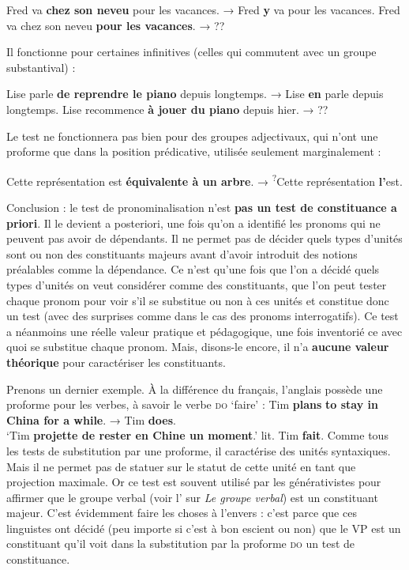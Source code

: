 {    \ea
    {Fred va} \textbf{{chez son neveu}}  {pour les vacances.}     \textrm{→}   {Fred} \textbf{{y}}  {va pour les vacances.}
    \z
    \ea
    {Fred va chez son neveu} \textbf{{pour les vacances}}.     \textrm{→}  ??
    \z

    Il fonctionne pour certaines infinitives (celles qui commutent avec un groupe substantival) :

    \ea
    {Lise parle} \textbf{{de reprendre le piano}}  {depuis longtemps.}    \textrm{→}   {Lise} \textbf{{en}}  {parle depuis longtemps.}
    \z
    \ea
    {Lise recommence} \textbf{{à jouer du piano}}  {depuis hier.}     \textrm{→}  ??
    \z

    Le test ne fonctionnera pas bien pour des groupes adjectivaux, qui n’ont une proforme que dans la position prédicative, utilisée seulement marginalement :

    \ea
    {Cette représentation est} \textbf{{équivalente à un arbre}}.     \textrm{→}  \textsuperscript{?}{Cette représentation} \textbf{{l’}}{est.}
    \z

    Conclusion : le test de pronominalisation n’est \textbf{pas un test de constituance a priori}. Il le devient a posteriori, une fois qu’on a identifié les pronoms qui ne peuvent pas avoir de dépendants. Il ne permet pas de décider quels types d’unités sont ou non des constituants majeurs avant d’avoir introduit des notions préalables comme la dépendance. Ce n’est qu’une fois que l’on a décidé quels types d’unités on veut considérer comme des constituants, que l’on peut tester chaque pronom pour voir s’il se substitue ou non à ces unités et constitue donc un test (avec des surprises comme dans le cas des pronoms interrogatifs). Ce test a néanmoins une réelle valeur pratique et pédagogique, une fois inventorié ce avec quoi se substitue chaque pronom. Mais, disons-le encore, il n’a \textbf{aucune valeur théorique} pour caractériser les constituants.

    Prenons un dernier exemple. À la différence du français, l’anglais possède une proforme pour les verbes, à savoir le verbe \textsc{do} ‘faire’ :
    \ea
        {Tim} \textbf{{plans}} \textbf{{to stay in China for a while}}.      \textrm{→}   {Tim} \textbf{{does}}.\\
        \glt   ‘Tim \textbf{projette de rester en Chine un moment}.’     lit. Tim \textbf{fait}.
    \z
    Comme tous les tests de substitution par une proforme, il caractérise des unités syntaxiques. Mais il ne permet pas de statuer sur le statut de cette unité en tant que projection maximale. Or ce test est souvent utilisé par les générativistes pour affirmer que le groupe verbal (voir l’ sur \textit{Le groupe verbal}) est un constituant majeur. C’est évidemment faire les choses à l’envers : c’est parce que ces linguistes ont décidé (peu importe si c’est à bon escient ou non) que le VP est un constituant qu’il voit dans la substitution par la proforme \textsc{do} un test de constituance.
}
